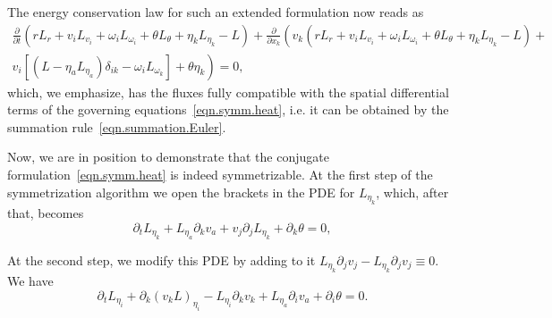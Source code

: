\documentclass[twoside]{article}
\newcommand{\pd}{\partial}
\begin{document}
The energy conservation law for such an extended formulation now reads as
\begin{multline}\label{eqn.symm.heat.energy}
\frac{\pd }{\pd t}(r L_r + v_i L_{v_i} + \omega_i L_{\omega_i} + \theta 
L_\theta + \eta_k 
L_{\eta_k} - L) + \frac{\pd }{\pd x_k}\left(v_k\left(r L_r + v_i L_{v_i} + 
\omega_i L_{\omega_i} + \theta L_\theta + \eta_k L_{\eta_k} - L\right) + 
\right.\\
\left. v_i\left[\left(L - \eta_a L_{\eta_a} 
\right) \delta_{ik} - \omega_i L_{\omega_k}\right] + \theta \eta_k \right)=0,
\end{multline}
which, we emphasize, has the fluxes fully compatible with the spatial 
differential terms of the governing equations~\eqref{eqn.symm.heat}, i.e. it 
can be obtained by 
the summation 
rule~\eqref{eqn.summation.Euler}.

Now, we are in position to demonstrate that the conjugate 
formulation~\eqref{eqn.symm.heat} is indeed symmetrizable.
At the first step of the symmetrization algorithm we open the brackets 
in the PDE for $ L_{\eta_k} $, which, after that, becomes
\begin{equation}\label{eqn.symm.heat.step1}
\pd _tL_{\eta _k} + L_{\eta _a}\pd _kv_a+v_j\pd _jL_{\eta 
_k}+\pd _k\theta =0,
\end{equation}

At the second step, we modify this PDE by adding to it $ 
L_{\eta_k}\pd_j v_j - L_{\eta_k} \pd_j v_j \equiv 0 $. We have
\begin{equation}
\pd _tL_{\eta _i}+\pd _k\left(v_kL\right)_{\eta _i}-L_{\eta _i}\pd 
_kv_k+L_{\eta _a}\pd _iv_a+\pd _i\theta =0.
\end{equation}
\end{document}
